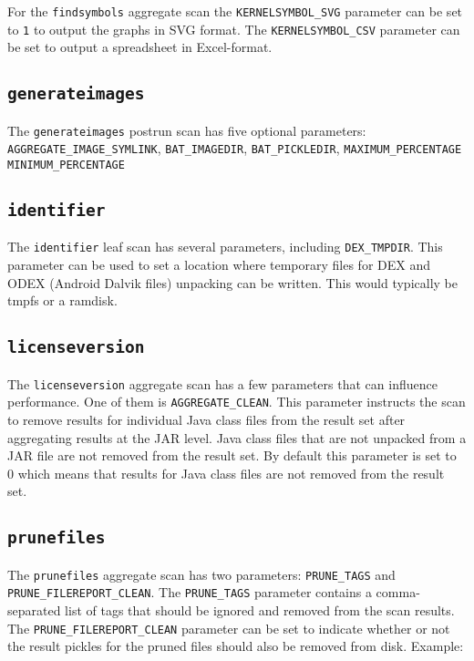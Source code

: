 \documentclass[10pt,a4paper]{article}
\begin{document}
For the \texttt{findsymbols} aggregate scan the \texttt{KERNELSYMBOL\_SVG}
parameter can be set to \texttt{1} to output the graphs in SVG format. The
\texttt{KERNELSYMBOL\_CSV} parameter can be set to output a spreadsheet in
Excel-format.

\subsection{\texttt{generateimages}}

The \texttt{generateimages} postrun scan has five optional parameters:
\texttt{AGGREGATE\_IMAGE\_SYMLINK}, \texttt{BAT\_IMAGEDIR}, \texttt{BAT\_PICKLEDIR}, \texttt{MAXIMUM\_PERCENTAGE}
\texttt{MINIMUM\_PERCENTAGE}

\subsection{\texttt{identifier}}

The \texttt{identifier} leaf scan has several parameters, including
\texttt{DEX\_TMPDIR}. This parameter can be used to set a location where
temporary files for DEX and ODEX (Android Dalvik files) unpacking can be
written. This would typically be tmpfs or a ramdisk.

\subsection{\texttt{licenseversion}}

The \texttt{licenseversion} aggregate scan has a few parameters that can
influence performance. One of them is \texttt{AGGREGATE\_CLEAN}. This parameter
instructs the scan to remove results for individual Java class files from the
result set after aggregating results at the JAR level. Java class files that
are not unpacked from a JAR file are not removed from the result set. By
default this parameter is set to 0 which means that results for Java class
files are not removed from the result set.

\subsection{\texttt{prunefiles}}

The \texttt{prunefiles} aggregate scan has two parameters: \texttt{PRUNE\_TAGS}
and \texttt{PRUNE\_FILEREPORT\_CLEAN}. The \texttt{PRUNE\_TAGS} parameter
contains a comma-separated list of tags that should be ignored and removed from
the scan results. The \texttt{PRUNE\_FILEREPORT\_CLEAN} parameter can be set to
indicate whether or not the result pickles for the pruned files should also be
removed from disk. Example:
\end{document}
